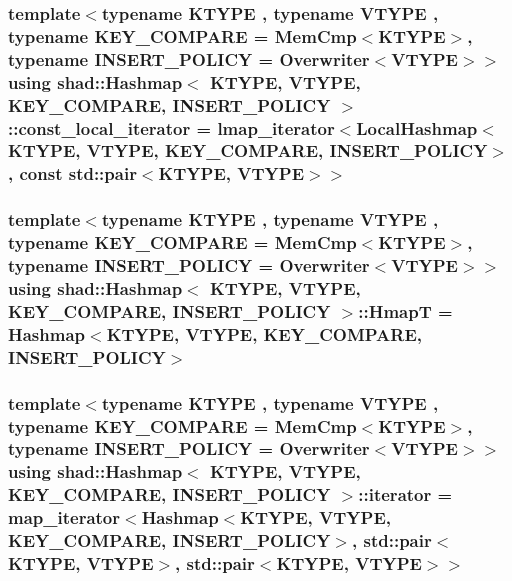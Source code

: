 \hypertarget{classshad_1_1Hashmap_afdf2dad495223a7d8bcec4256b591d89}{
\subsubsection[{const\-\_\-local\-\_\-iterator}]{\setlength{\rightskip}{0pt plus 5cm}template$<$typename K\-T\-Y\-P\-E , typename V\-T\-Y\-P\-E , typename K\-E\-Y\-\_\-\-C\-O\-M\-P\-A\-R\-E  = Mem\-Cmp$<$\-K\-T\-Y\-P\-E$>$, typename I\-N\-S\-E\-R\-T\-\_\-\-P\-O\-L\-I\-C\-Y  = Overwriter$<$\-V\-T\-Y\-P\-E$>$$>$ using {\bf shad\-::\-Hashmap}$<$ K\-T\-Y\-P\-E, V\-T\-Y\-P\-E, K\-E\-Y\-\_\-\-C\-O\-M\-P\-A\-R\-E, I\-N\-S\-E\-R\-T\-\_\-\-P\-O\-L\-I\-C\-Y $>$\-::{\bf const\-\_\-local\-\_\-iterator} =  {\bf lmap\-\_\-iterator}$<${\bf Local\-Hashmap}$<$K\-T\-Y\-P\-E, V\-T\-Y\-P\-E, K\-E\-Y\-\_\-\-C\-O\-M\-P\-A\-R\-E, I\-N\-S\-E\-R\-T\-\_\-\-P\-O\-L\-I\-C\-Y$>$, const std\-::pair$<$K\-T\-Y\-P\-E, V\-T\-Y\-P\-E$>$$>$}}\label{classshad_1_1Hashmap_afdf2dad495223a7d8bcec4256b591d89}
\hypertarget{classshad_1_1Hashmap_a8a56b050ace0e26454959cc45cdcb211}{
\subsubsection[{Hmap\-T}]{\setlength{\rightskip}{0pt plus 5cm}template$<$typename K\-T\-Y\-P\-E , typename V\-T\-Y\-P\-E , typename K\-E\-Y\-\_\-\-C\-O\-M\-P\-A\-R\-E  = Mem\-Cmp$<$\-K\-T\-Y\-P\-E$>$, typename I\-N\-S\-E\-R\-T\-\_\-\-P\-O\-L\-I\-C\-Y  = Overwriter$<$\-V\-T\-Y\-P\-E$>$$>$ using {\bf shad\-::\-Hashmap}$<$ K\-T\-Y\-P\-E, V\-T\-Y\-P\-E, K\-E\-Y\-\_\-\-C\-O\-M\-P\-A\-R\-E, I\-N\-S\-E\-R\-T\-\_\-\-P\-O\-L\-I\-C\-Y $>$\-::{\bf Hmap\-T} =  {\bf Hashmap}$<$K\-T\-Y\-P\-E, V\-T\-Y\-P\-E, K\-E\-Y\-\_\-\-C\-O\-M\-P\-A\-R\-E, I\-N\-S\-E\-R\-T\-\_\-\-P\-O\-L\-I\-C\-Y$>$}}\label{classshad_1_1Hashmap_a8a56b050ace0e26454959cc45cdcb211}
\hypertarget{classshad_1_1Hashmap_a4603e48d3ad3a380abc888671e55bf01}{
\subsubsection[{iterator}]{\setlength{\rightskip}{0pt plus 5cm}template$<$typename K\-T\-Y\-P\-E , typename V\-T\-Y\-P\-E , typename K\-E\-Y\-\_\-\-C\-O\-M\-P\-A\-R\-E  = Mem\-Cmp$<$\-K\-T\-Y\-P\-E$>$, typename I\-N\-S\-E\-R\-T\-\_\-\-P\-O\-L\-I\-C\-Y  = Overwriter$<$\-V\-T\-Y\-P\-E$>$$>$ using {\bf shad\-::\-Hashmap}$<$ K\-T\-Y\-P\-E, V\-T\-Y\-P\-E, K\-E\-Y\-\_\-\-C\-O\-M\-P\-A\-R\-E, I\-N\-S\-E\-R\-T\-\_\-\-P\-O\-L\-I\-C\-Y $>$\-::{\bf iterator} =  {\bf map\-\_\-iterator}$<${\bf Hashmap}$<$K\-T\-Y\-P\-E, V\-T\-Y\-P\-E, K\-E\-Y\-\_\-\-C\-O\-M\-P\-A\-R\-E, I\-N\-S\-E\-R\-T\-\_\-\-P\-O\-L\-I\-C\-Y$>$, std\-::pair$<$K\-T\-Y\-P\-E, V\-T\-Y\-P\-E$>$, std\-::pair$<$K\-T\-Y\-P\-E, V\-T\-Y\-P\-E$>$$>$}}\label{classshad_1_1Hashmap_a4603e48d3ad3a380abc888671e55bf01}
